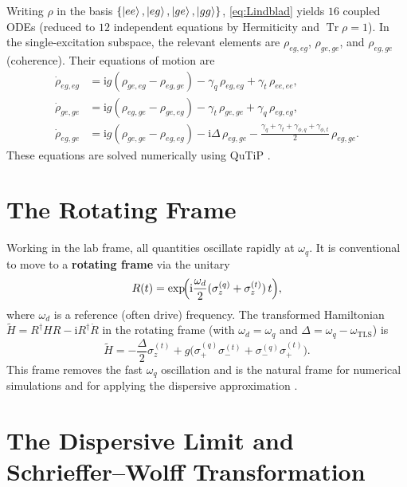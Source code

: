 \documentclass[12pt,a4paper]{article}
\newcommand{\Tr}{\operatorname{Tr}}
\newcommand{\ii}{\mathrm{i}}
\newcommand{\wq}{\omega_q}
\newcommand{\wt}{\omega_{\mathrm{TLS}}}
\newcommand{\wd}{\omega_d}
\newcommand{\D}{\Delta}
\newcommand{\smq}{\sigma_-^{(q)}}
\newcommand{\spq}{\sigma_+^{(q)}}
\newcommand{\smt}{\sigma_-^{(t)}}
\newcommand{\spt}{\sigma_+^{(t)}}
\newcommand{\szq}{\sigma_z^{(q)}}
\newcommand{\szt}{\sigma_z^{(t)}}
\begin{document}
Writing $\rho$ in the basis $\{\ket{ee},\ket{eg},\ket{ge},\ket{gg}\}$,
\eqref{eq:Lindblad} yields $16$ coupled ODEs (reduced to $12$ independent
equations by Hermiticity and $\Tr\rho = 1$). In the single-excitation
subspace, the relevant elements are
$\rho_{eg,eg}$, $\rho_{ge,ge}$, and $\rho_{eg,ge}$ (coherence).
Their equations of motion are
\begin{align}
  \dot\rho_{eg,eg}
    &= \ii g(\rho_{ge,eg} - \rho_{eg,ge})
      - \gamma_q\,\rho_{eg,eg}
      + \gamma_t\,\rho_{ee,ee},
      \label{eq:rho_egeg}\\
  \dot\rho_{ge,ge}
    &= \ii g(\rho_{eg,ge} - \rho_{ge,eg})
      - \gamma_t\,\rho_{ge,ge}
      + \gamma_q\,\rho_{eg,eg},
      \label{eq:rho_gege}\\
  \dot\rho_{eg,ge}
    &= \ii g(\rho_{ge,ge} - \rho_{eg,eg})
      - \ii\D\,\rho_{eg,ge}
      - \frac{\gamma_q + \gamma_t
              + \gamma_{\phi,q} + \gamma_{\phi,t}}{2}\,\rho_{eg,ge}.
      \label{eq:rho_egge}
\end{align}
These equations are solved numerically using QuTiP \cite{Johansson2012}.

\section{The Rotating Frame}

Working in the lab frame, all quantities oscillate rapidly at $\wq$.
It is conventional to move to a \textbf{rotating frame} via the unitary
\begin{equation}
  R(t) = \exp\!\Bigl(\ii\frac{\wd}{2}(\szq + \szt)\,t\Bigr),
\end{equation}
where $\wd$ is a reference (often drive) frequency.
The transformed Hamiltonian $\tilde H = R^\dagger H R - \ii R^\dagger\dot R$
in the rotating frame (with $\wd = \wq$ and $\D = \wq - \wt$) is
\begin{equation}
  \tilde H = -\frac{\D}{2}\szt
           + g\bigl(\spq\smt + \smq\spt\bigr).
  \label{eq:H_rot}
\end{equation}
This frame removes the fast $\wq$ oscillation and is the natural
frame for numerical simulations and for applying the dispersive
approximation \cite{Blais2021}.

\section{The Dispersive Limit and Schrieffer--Wolff Transformation}
\end{document}
